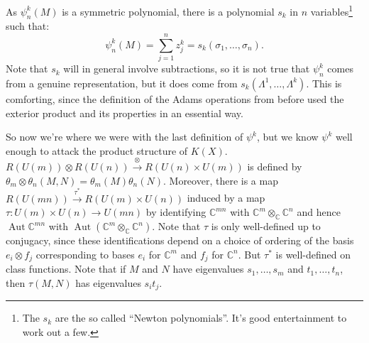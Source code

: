 \documentclass{article}
\newcommand{\C}{\mathbb{C}}
\DeclareMathOperator{\Aut}{Aut}
\begin{document}
As $\psi^k_n(M)$ is a symmetric polynomial, there is a polynomial $s_k$ in $n$ variables\footnote{The $s_k$ are the so called ``Newton polynomials''. It's good entertainment to work out a few.} such that:
\[\psi^k_n(M)=\sum_{j=1}^n z_j^k=s_k(\sigma_1,\ldots,\sigma_n).\]
Note that $s_k$ will in general involve subtractions, so it is not true that $\psi^k_n$ comes from a genuine representation, but it does come from $s_k(\Lambda^1, \ldots, \Lambda^k)$.  This is comforting, since the definition of the Adams operations from before used the exterior product and its properties in an essential way.

So now we're where we were with the last definition of $\psi^k$, but we know $\psi^k$ well enough to attack the product structure of $K(X)$.  $R(U(m)) \otimes R(U(n)) \stackrel{\otimes}{\to} R(U(n) \times U(m))$ is defined by $\theta_m \otimes \theta_n(M, N) = \theta_m(M) \theta_n(N)$.  Moreover, there is a map $R(U(mn)) \stackrel{\tau^*}{\to} R(U(m) \times U(n))$ induced by a map $\tau: U(m) \times U(n) \to U(mn)$ by identifying $\C^{mn}$ with $\C^m \otimes_\C \C^n$ and hence $\Aut \C^{mn}$ with $\Aut (\C^m \otimes_\C \C^n)$.  Note that $\tau$ is only well-defined up to conjugacy, since these identifications depend on a choice of ordering of the basis $e_i \otimes f_j$ corresponding to bases $e_i$ for $\C^m$ and $f_j$ for $\C^n$.  But $\tau^*$ is well-defined on class functions.  Note that if $M$ and $N$ have eigenvalues $s_1, \ldots, s_m$ and $t_1, \ldots, t_n$, then $\tau(M, N)$ has eigenvalues $s_i t_j$.
\end{document}
